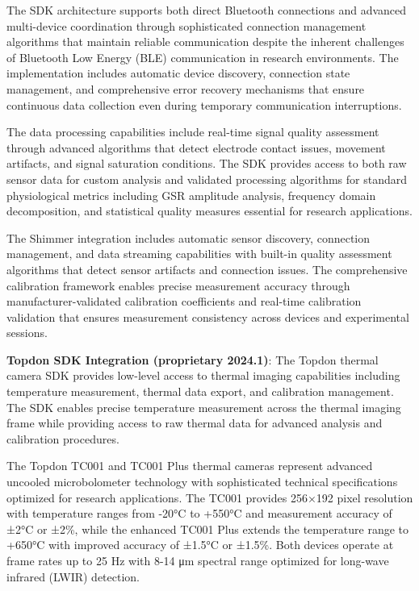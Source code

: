 \documentclass[12pt,a4paper]{report}
\begin{document}
The SDK architecture supports both direct Bluetooth connections and advanced multi-device coordination through
sophisticated connection management algorithms that maintain reliable communication despite the inherent challenges of
Bluetooth Low Energy (BLE) communication in research environments. The implementation includes automatic device
discovery, connection state management, and comprehensive error recovery mechanisms that ensure continuous data
collection even during temporary communication interruptions.

The data processing capabilities include real-time signal quality assessment through advanced algorithms that detect
electrode contact issues, movement artifacts, and signal saturation conditions. The SDK provides access to both raw
sensor data for custom analysis and validated processing algorithms for standard physiological metrics including GSR
amplitude analysis, frequency domain decomposition, and statistical quality measures essential for research
applications.

The Shimmer integration includes automatic sensor discovery, connection management, and data streaming capabilities with
built-in quality assessment algorithms that detect sensor artifacts and connection issues. The comprehensive calibration
framework enables precise measurement accuracy through manufacturer-validated calibration coefficients and real-time
calibration validation that ensures measurement consistency across devices and experimental sessions.

\textbf{Topdon SDK Integration (proprietary 2024.1)}: The Topdon thermal camera SDK provides low-level access to thermal
imaging capabilities including temperature measurement, thermal data export, and calibration management. The SDK enables
precise temperature measurement across the thermal imaging frame while providing access to raw thermal data for advanced
analysis and calibration procedures.

The Topdon TC001 and TC001 Plus thermal cameras represent advanced uncooled microbolometer technology with sophisticated
technical specifications optimized for research applications. The TC001 provides 256×192 pixel resolution with
temperature ranges from -20°C to +550°C and measurement accuracy of ±2°C or ±2\%, while the enhanced TC001 Plus extends
the temperature range to +650°C with improved accuracy of ±1.5°C or ±1.5\%. Both devices operate at frame rates up to 25
Hz with 8-14 μm spectral range optimized for long-wave infrared (LWIR) detection.
\end{document}
